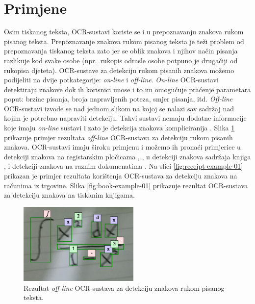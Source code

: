 \documentclass[times, utf8, zavrsni]{fer}
\begin{document}
\section{Primjene}
Osim tiskanog teksta, OCR-sustavi koriste se i u prepoznavanju znakova rukom
pisanog teksta. Prepoznavanje znakova rukom pisanog teksta je teži problem od
prepoznavanja tiskanog teksta \citep{DBLP:journals/corr/abs-1710-05703} zato jer
se oblik znakova i njihov način pisanja razlikuje kod svake osobe (npr.\
rukopis odrasle osobe potpuno je drugačiji od rukopisa djeteta).
OCR-sustave za detekciju rukom pisanih znakova možemo podijeliti na dvije
potkategorije: \emph{on-line} i \emph{off-line}. \emph{On-line} OCR-sustavi
detektiraju znakove dok ih korisnici unose i to im omogućuje praćenje
parametara poput: brzine pisanja, broja napravljenih poteza,
smjer pisanja, itd. \emph{Off-line} OCR-sustavi izvode se nad jednom slikom na
kojoj se nalazi sav sadržaj nad kojim je potrebno napraviti detekciju. Takvi
sustavi nemaju dodatne informacije koje imaju \emph{on-line} sustavi i zato je
detekcija znakova kompliciranija \citep{DBLP:journals/corr/abs-1710-05703}.
Slika \ref{fig:math-example-01} prikazuje primjer rezultata \emph{off-line}
OCR-sustava za detekciju rukom pisanih znakova. OCR-sustavi imaju široku
primjenu i možemo ih pronaći primjerice u detekciji znakova na registarskim
pločicama \citep{DBLP:journals/corr/Saghaei16a},
\citep{DBLP:journals/corr/abs-1802-09567}, u detekciji znakova sadržaja knjiga
\citep{DBLP:journals/corr/abs-1802-10033},
\citep{Christy:2017:MDE:3172938.3075645} i detekciji znakova na raznim
dokumenatima \citep{DBLP:journals/corr/HarrajR15} \citep{verma2016ocr}. Na
slici \ref{fig:receipt-example-01} prikazan je primjer rezultata korištenja
OCR-sustava za detekciju znakova na računima iz trgovine. Slika
\ref{fig:book-example-01} prikazuje rezultat OCR-sustava za detekciju znakova
na tiskanim knjigama.

\pagebreak

\begin{figure}[htb]
    \centering
    \captionsetup{justification=centering,margin=2cm}
    \includegraphics[height=4cm]{images/math-example-01.png}
    \caption{
        Rezultat \emph{off-line} OCR-sustava za detekciju znakova rukom pisanog
        teksta.
    }
    \label{fig:math-example-01}
\end{figure}
\end{document}
